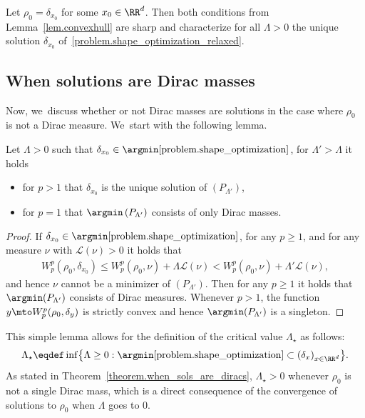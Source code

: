 \begin{example}
Let $\rho_0= \delta_{x_0}$ for some $x_0 \in \RR^d$. Then both
conditions from Lemma~\ref{lem.convexhull} are sharp and
characterize for all $\Lambda>0$ the unique solution $\delta_{x_0}$
of~\eqref{problem.shape_optimization_relaxed}.
\end{example}

\subsection{When solutions are Dirac masses}
Now, we~discuss whether or not Dirac masses are solutions in the case where $\rho_0$ is not a Dirac measure. We~start with the following lemma.

\begin{lemma}\label{lemma.trashold_lambda}
Let $\Lambda > 0$ such that $\delta_{x_0} \in \argmin\eqref{problem.shape_optimization}$,
for $\Lambda' > \Lambda$ it holds
\begin{itemize}
\item for $p > 1$ that $\delta_{x_0}$ is the unique solution
of $(P_{\Lambda'})$,
\item for $p = 1$ that $\argmin\, (P_{\Lambda'})$
consists of only Dirac masses.
\end{itemize}
\end{lemma}

\begin{proof}
If $\delta_{x_0} \in \argmin \eqref{problem.shape_optimization}$, for any $p \ge 1$, and for any measure $\nu$ with $\mathcal{L}(\nu) > 0$ it holds that
\begin{align*}
W_p^p(\rho_0, \delta_{x_0})
\le
W_p^p(\rho_0, \nu) + \Lambda \mathcal{L}(\nu)
<
W_p^p(\rho_0, \nu) + \Lambda' \mathcal{L}(\nu),
\end{align*}
and hence $\nu$ cannot be a minimizer of $(P_{\Lambda'})$. Then for any $p \ge 1$ it holds that $\argmin (P_{\Lambda'})$ consists of Dirac measures. Whenever $p > 1$, the function $y \mto W_p^p(\rho_0, \delta_y)$ is strictly convex and hence $\argmin (P_{\Lambda'})$ is a singleton.
\end{proof}

This simple lemma allows for the definition of the critical value $\Lambda_\star$ as follows:
\begin{equation}
\Lambda_\star
\eqdef
\inf
\bigl\{
\Lambda \ge 0:
\argmin \eqref{problem.shape_optimization}
\subset
\left(
\delta_{x}\right)_{x \in \RR^d}
\bigr\}.
\end{equation}
As stated in Theorem~\ref{theorem.when_sols_are_diracs}, $\Lambda_\star > 0$ whenever $\rho_0$ is not a single Dirac mass, which is a direct consequence of the convergence of solutions to $\rho_0$ when $\Lambda$ goes to $0$.

